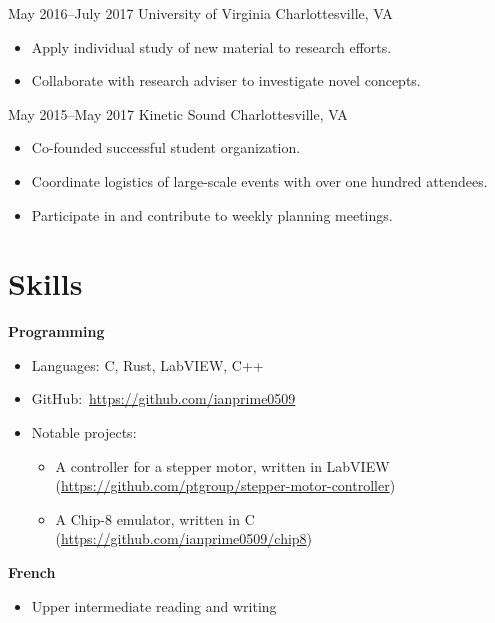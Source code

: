 \documentclass[10pt]{article}
\begin{document}
{May 2016--July 2017}
{University of Virginia}
{Charlottesville, VA}
\begin{itemize}
\item Apply individual study of new material to research efforts.
\item Collaborate with research adviser to investigate novel concepts.
\end{itemize}

{May 2015--May 2017}
{Kinetic Sound}
{Charlottesville, VA}
\begin{itemize}
\item Co-founded successful student organization.
\item Coordinate logistics of large-scale events with over one hundred attendees.
\item Participate in and contribute to weekly planning meetings.
\end{itemize}

\section*{Skills}
\textbf{Programming}
  \begin{itemize}
  \item Languages: C, Rust, LabVIEW, C++
  \item GitHub:~\url{https://github.com/ianprime0509}
  \item Notable projects:
    \begin{itemize}
    \item A controller for a stepper motor, written in LabVIEW
      (\url{https://github.com/ptgroup/stepper-motor-controller})
    \item A Chip-8 emulator, written in C
      (\url{https://github.com/ianprime0509/chip8})
    \end{itemize}
  \end{itemize}
\textbf{French}
  \begin{itemize}
  \item Upper intermediate reading and writing
  \end{itemize}
\end{document}
